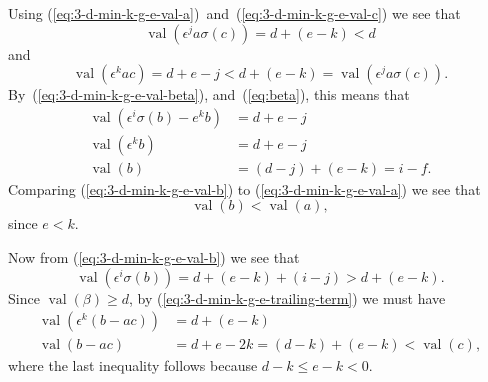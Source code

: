 \documentclass{amsart}
\theoremstyle{definition}
\def\e{\epsilon}
\def\val{\mathop{\mathrm{val}}}
\def\s{\sigma}
\begin{document}
  Using (\ref{eq:3-d-min-k-g-e-val-a})~and~(\ref{eq:3-d-min-k-g-e-val-c}) we
  see that
  \begin{equation}
    \label{eq:3-d-min-k-g-e-trailing-term}
    \val(\e^j a\s(c)) = d + (e - k) < d
  \end{equation}
  and
  \begin{equation*}
    \val(\e^k a c) = d + e - j < d + (e - k) = \val(\e^j a\s(c)).
  \end{equation*}
  By~(\ref{eq:3-d-min-k-g-e-val-beta}), and~(\ref{eq:beta}), this means that
  \begin{align}
    \val(\e^i\s(b) - e^k b) &= d + e - j \nonumber \\
    \val(\e^k b) &= d + e - j \nonumber \\
    \label{eq:3-d-min-k-g-e-val-b}
    \val(b) &= (d-j) + (e - k) = i - f.
  \end{align}
  Comparing (\ref{eq:3-d-min-k-g-e-val-b}) to (\ref{eq:3-d-min-k-g-e-val-a}) we
  see that
  \begin{equation}
    \label{eq:3-d-min-k-g-e-val-b-l-a}
    \val(b) < \val(a),
  \end{equation}
  since $e < k$.

  Now from (\ref{eq:3-d-min-k-g-e-val-b}) we see that
  \begin{equation*}
    \val(\e^i \s(b)) = d + (e-k) + (i - j) > d + (e - k).
  \end{equation*}
  Since $\val(\beta) \ge d$, by (\ref{eq:3-d-min-k-g-e-trailing-term}) we must
  have
  \begin{align}
    \val(\e^k(b-ac)) &= d + (e-k) \nonumber \\
    \label{eq:3-d-min-k-g-e-val-b-m-ac}
    \val(b - ac) &= d + e - 2k = (d - k) + (e - k) < \val(c),
  \end{align}
  where the last inequality follows because $d - k \le e - k < 0$.
\end{document}
